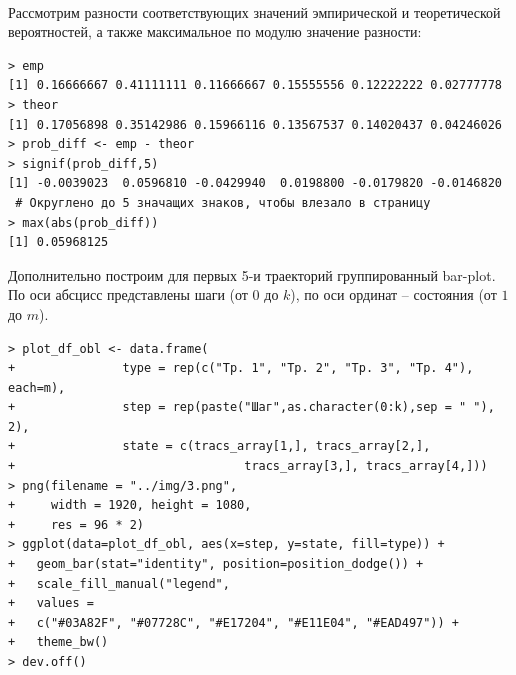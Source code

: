 \documentclass[14pt,a4paper]{scrartcl}
\begin{document}
\begin{figure}[H]
	\begin{minipage}[h]{1\linewidth}
		  \\
	\end{minipage}
\end{figure}


Рассмотрим разности соответствующих значений эмпирической и теоретической вероятностей, а также максимальное по модулю значение разности:

\begin{verbatim}
> emp
[1] 0.16666667 0.41111111 0.11666667 0.15555556 0.12222222 0.02777778
> theor
[1] 0.17056898 0.35142986 0.15966116 0.13567537 0.14020437 0.04246026
> prob_diff <- emp - theor
> signif(prob_diff,5)
[1] -0.0039023  0.0596810 -0.0429940  0.0198800 -0.0179820 -0.0146820
 # Округлено до 5 значащих знаков, чтобы влезало в страницу
> max(abs(prob_diff))
[1] 0.05968125
\end{verbatim}

Дополнительно построим для первых 5-и траекторий группированный bar-plot. По оси абсцисс представлены шаги (от $0$ до $k$), по оси ординат -- состояния (от $1$ до $m$).

\begin{verbatim}
> plot_df_obl <- data.frame(
+               type = rep(c("Тр. 1", "Тр. 2", "Тр. 3", "Тр. 4"), each=m),
+               step = rep(paste("Шаг",as.character(0:k),sep = " "), 2),
+               state = c(tracs_array[1,], tracs_array[2,], 
+                                tracs_array[3,], tracs_array[4,]))
> png(filename = "../img/3.png",
+     width = 1920, height = 1080,
+     res = 96 * 2)
> ggplot(data=plot_df_obl, aes(x=step, y=state, fill=type)) +
+   geom_bar(stat="identity", position=position_dodge()) +
+   scale_fill_manual("legend", 
+   values = 
+	c("#03A82F", "#07728C", "#E17204", "#E11E04", "#EAD497")) +
+   theme_bw()
> dev.off()
\end{verbatim}
\end{document}
